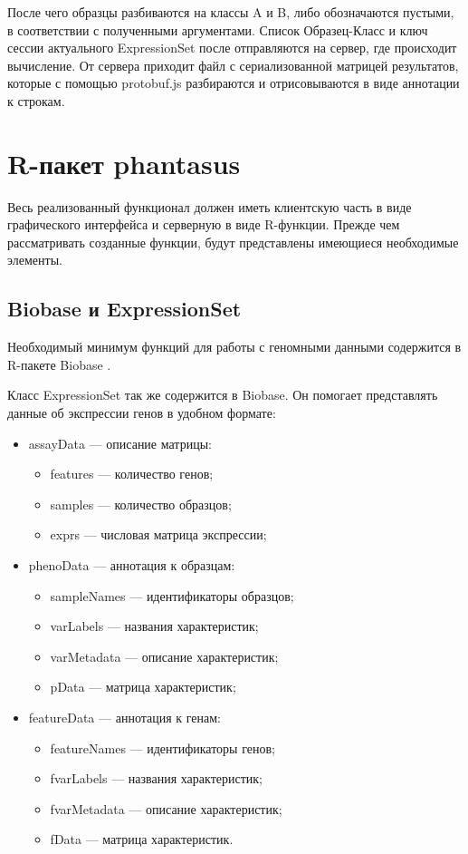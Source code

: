 \documentclass[annotation,specification]{itmo-student-thesis}
\begin{document}
После чего образцы разбиваются на классы A и B, либо обозначаются пустыми, в соответствии с полученными аргументами. Список Образец-Класс и ключ сессии актуального ExpressionSet после отправляются на сервер, где происходит вычисление.
От сервера приходит файл с сериализованной матрицей результатов, которые с помощью protobuf.js разбираются и отрисовываются в виде аннотации к строкам.

\section{R-пакет phantasus}
Весь реализованный функционал должен иметь клиентскую часть в виде графического интерфейса и серверную в виде R-функции.
Прежде чем рассматривать созданные функции, будут представлены имеющиеся необходимые элементы.

\subsection{Biobase и ExpressionSet}
Необходимый минимум функций для работы с геномными данными содержится в R-пакете Biobase \cite{biobase}.

Класс ExpressionSet \cite{expressionset} так же содержится в Biobase. Он помогает представлять данные об экспрессии генов в удобном формате:
\begin{itemize}
\item assayData --- описание матрицы:\begin{itemize}
\item features --- количество генов;
\item samples --- количество образцов;
\item exprs --- числовая матрица экспрессии; \end{itemize}
\item phenoData --- аннотация к образцам:\begin{itemize}
\item sampleNames --- идентификаторы образцов;
\item varLabels --- названия характеристик;
\item varMetadata --- описание характеристик;
\item pData --- матрица характеристик;\end{itemize}
\item featureData --- аннотация к генам:\begin{itemize}
\item featureNames --- идентификаторы генов;
\item fvarLabels --- названия характеристик;
\item fvarMetadata --- описание характеристик;
\item fData --- матрица характеристик.\end{itemize}
\end{itemize}
\end{document}
